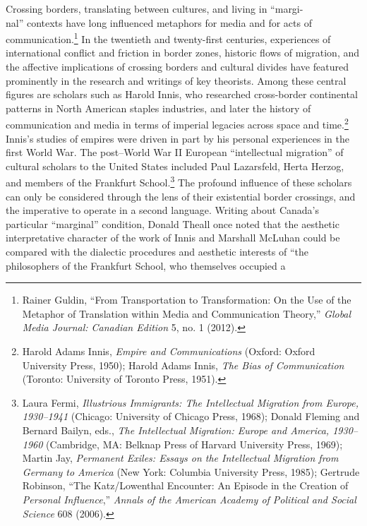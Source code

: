 \documentclass{tufte-handout}
\begin{document}
Crossing borders, translating between cultures, and living in ``margi-\\\noindent
nal'' contexts have long influenced metaphors for media and for
acts of communication.\footnote{Rainer Guldin, ``From Transportation to
  Transformation: On the Use of the Metaphor of Translation within Media
  and Communication Theory,'' \emph{Global Media Journal: Canadian
  Edition} 5, no. 1 (2012).} In the twentieth and twenty-first
centuries, experiences of international conflict and friction in border
zones, historic flows of migration, and the affective implications of
crossing borders and cultural divides have featured prominently in the
research and writings of key theorists. Among these central figures are
scholars such as Harold Innis, who researched cross-border continental
patterns in North American staples industries, and later the history of
communication and media in terms of imperial legacies across space and
time.\footnote{Harold Adams Innis, \emph{Empire and Communications}
  (Oxford: Oxford University Press, 1950); Harold Adams Innis, \emph{The
  Bias of Communication} (Toronto: University of Toronto Press, 1951).}
Innis's studies of empires were driven in part by his personal
experiences in the first World War. The post--World War II European
``intellectual migration'' of cultural scholars to the United States
included Paul Lazarsfeld, Herta Herzog, and members of the Frankfurt
School.\footnote{Laura Fermi, \emph{Illustrious Immigrants: The
  Intellectual Migration from Europe, 1930--1941} (Chicago: University
  of Chicago Press, 1968); Donald Fleming and Bernard Bailyn, eds.,
  \emph{The Intellectual Migration: Europe and America, 1930--1960}
  (Cambridge, MA: Belknap Press of Harvard University Press, 1969);
  Martin Jay, \emph{Permanent Exiles: Essays on the Intellectual
  Migration from Germany to America} (New York: Columbia University
  Press, 1985); Gertrude Robinson, ``The Katz/Lowenthal Encounter: An
  Episode in the Creation of \emph{Personal Influence},'' \emph{Annals
  of the American Academy of Political and Social Science} 608 (2006).}
The profound influence of these scholars can only be considered through
the lens of their existential border crossings, and the imperative to
operate in a second language. Writing about Canada's particular
``marginal'' condition, Donald Theall once noted that the aesthetic
interpretative character of the work of Innis and Marshall McLuhan could
be compared with the dialectic procedures and aesthetic interests of
``the philosophers of the Frankfurt School, who themselves occupied a
\end{document}
